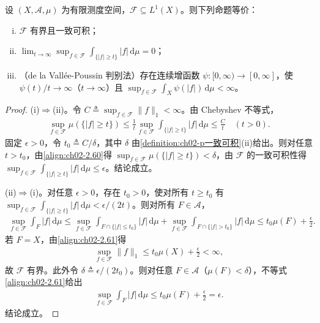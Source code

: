 \documentclass[../../main.tex]{subfiles}%
\begin{document}
\begin{proposition}\label{proposition:ch02-有界一致可积等价}
设 $(X,\mathscr A,\mu)$ 为有限测度空间，$\mathscr F\subseteq L^1(X)$。则下列命题等价：
\begin{enumerate}[(i)]
\item $\mathscr F$ 有界且一致可积；
\item $\lim_{t\to\infty}\sup_{f\in\mathscr F}\int_{\{|f|\geqslant t\}}|f|\,\mathrm{d}\mu=0$；
\item （de la Vall\'ee-Poussin 判别法）存在连续增函数 $\psi:[0,\infty)\to[0,\infty]$，使 $\psi(t)/t\to\infty$（$t\to\infty$）且 $\sup_{f\in\mathscr F}\int_X\psi(|f|)\,\mathrm{d}\mu<\infty$。
\end{enumerate}
\end{proposition}

\begin{proof}
(i)$\Rightarrow$(ii)。令 $C\triangleq \sup_{f\in\mathscr F}\|f\|_1<\infty$。由 Chebyshev 不等式，
\begin{align}
\sup_{f\in\mathscr F}\mu(\{|f|\geqslant t\})\leqslant\frac1t\sup_{f\in\mathscr F}\int_{\{|f|\geqslant t\}}|f|\,\mathrm{d}\mu\leqslant\frac Ct\quad(t>0). \label{align:ch02-2.60}
\end{align}
固定 $\epsilon>0$，令 $t_0\triangleq C/\delta$，其中 $\delta$ 由\cref{definition:ch02-p一致可积}(ii)给出。则对任意 $t>t_0$，由\eqref{align:ch02-2.60}得 $\sup_{f\in\mathscr F}\mu(\{|f|\geqslant t\})<\delta$，由 $\mathscr F$ 的一致可积性得 $\sup_{f\in\mathscr F}\int_{\{|f|\geqslant t\}}|f|\,\mathrm{d}\mu\leqslant\epsilon$。结论成立。

(ii)$\Rightarrow$(i)。对任意 $\epsilon>0$，存在 $t_0>0$，使对所有 $t\geqslant t_0$ 有 $\sup_{f\in\mathscr F}\int_{\{|f|\geqslant t\}}|f|\,\mathrm{d}\mu<\epsilon/(2t)$。则对所有 $F\in\mathscr A$，
\begin{align}
\sup_{f\in\mathscr F}\int_F|f|\,\mathrm{d}\mu
\leqslant\sup_{f\in\mathscr F}\int_{F\cap\{|f|\leqslant t_0\}}|f|\,\mathrm{d}\mu
+\sup_{f\in\mathscr F}\int_{F\cap\{|f|>t_0\}}|f|\,\mathrm{d}\mu
\leqslant t_0\mu(F)+\frac\epsilon2. \label{align:ch02-2.61}
\end{align}
若 $F=X$，由\eqref{align:ch02-2.61}得
\begin{align*}
\sup_{f\in\mathscr F}\|f\|_1\leqslant t_0\mu(X)+\frac\epsilon2<\infty,
\end{align*}
故 $\mathscr F$ 有界。此外令 $\delta\triangleq \epsilon/(2t_0)$。则对任意 $F\in\mathscr A$（$\mu(F)<\delta$），不等式\eqref{align:ch02-2.61}给出
\begin{align*}
\sup_{f\in\mathscr F}\int_F|f|\,\mathrm{d}\mu\leqslant t_0\mu(F)+\frac\epsilon2=\epsilon.
\end{align*}
结论成立。


\end{proof}
\end{document}
